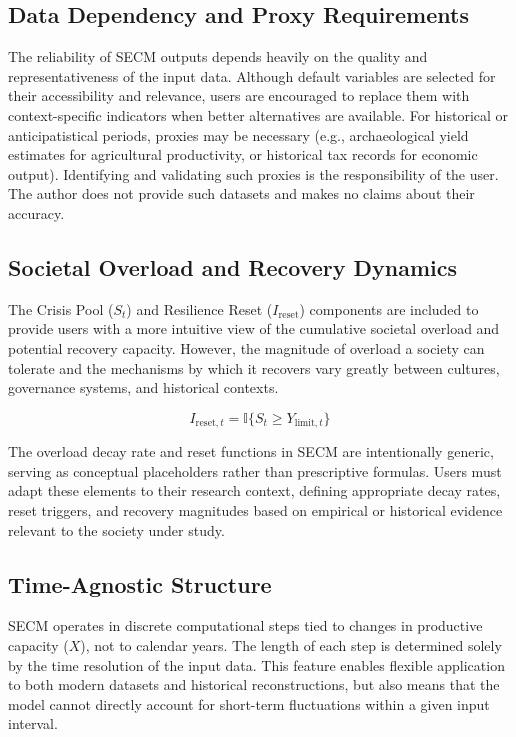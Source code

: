\documentclass[12pt,a4paper]{article}
\begin{document}
\subsection{Data Dependency and Proxy Requirements}
The reliability of SECM outputs depends heavily on the quality and representativeness of the input data. Although default variables are selected for their accessibility and relevance, users are encouraged to replace them with context-specific indicators when better alternatives are available.  
For historical or anticipatistical periods, proxies may be necessary (e.g., archaeological yield estimates for agricultural productivity, or historical tax records for economic output). Identifying and validating such proxies is the responsibility of the user. The author does not provide such datasets and makes no claims about their accuracy.

\subsection{Societal Overload and Recovery Dynamics}
The Crisis Pool ($S_t$) and Resilience Reset ($I_{\mathrm{reset}}$) components are included to provide users with a more intuitive view of the cumulative societal overload and potential recovery capacity. However, the magnitude of overload a society can tolerate and the mechanisms by which it recovers vary greatly between cultures, governance systems, and historical contexts.

\begin{equation}
I_{\mathrm{reset},t} = \mathbb{I}\{S_t \ge Y_{\mathrm{limit},t}\}
\label{sec:Ireset}
\end{equation}


The overload decay rate and reset functions in SECM are intentionally generic, serving as conceptual placeholders rather than prescriptive formulas. Users must adapt these elements to their research context, defining appropriate decay rates, reset triggers, and recovery magnitudes based on empirical or historical evidence relevant to the society under study.

\subsection{Time-Agnostic Structure}
SECM operates in discrete computational steps tied to changes in productive capacity ($X$), not to calendar years. The length of each step is determined solely by the time resolution of the input data. This feature enables flexible application to both modern datasets and historical reconstructions, but also means that the model cannot directly account for short-term fluctuations within a given input interval.
\end{document}
